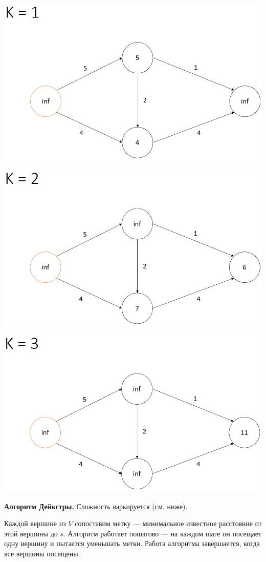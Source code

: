 \includegraphics[width=0.9\columnwidth]{pics/dop28_2.png}

\includegraphics[width=0.9\columnwidth]{pics/dop28_3.png}

\includegraphics[width=0.9\columnwidth]{pics/dop28_4.png}

\textbf{Алгоритм Дейкстры.} 
Сложность варьируется (см. ниже). 

Каждой вершине из $V$ сопоставим метку --- минимальное известное расстояние от этой вершины до $s$. 
Алгоритм работает пошагово --- на каждом шаге он посещает одну вершину и пытается уменьшать метки. 
Работа алгоритма завершается, когда все вершины посещены.


